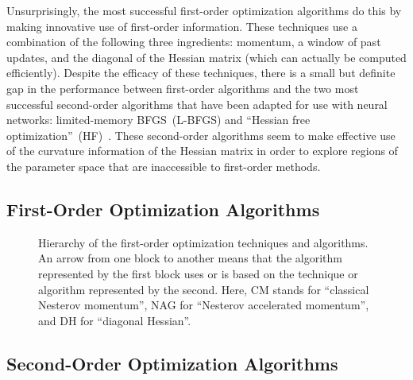 \documentclass[11pt,a4paper]{article}
\numberwithin{equation}{section}
\begin{document}
Unsurprisingly, the most successful first-order optimization algorithms do this
by making innovative use of first-order information. These techniques use a
combination of the following three ingredients: momentum, a window of past
updates, and the diagonal of the Hessian matrix (which can actually be computed
efficiently). Despite the efficacy of these techniques, there is a small but
definite gap in the performance between first-order algorithms and the two most
successful second-order algorithms that have been adapted for use with neural
networks: limited-memory BFGS~(L-BFGS) and ``Hessian free
optimization''~(HF)~\citep{martens2010deep, ngiam2011optimization,
sutskever2013importance}. These second-order algorithms seem to make effective
use of the curvature information of the Hessian matrix in order to explore
regions of the parameter space that are inaccessible to first-order methods.

\subsection{First-Order Optimization Algorithms}

\begin{figure}[t]
\centering
{}
\caption{Hierarchy of the first-order optimization techniques and algorithms.
An arrow from one block to another means that the algorithm represented by the
first block uses or is based on the technique or algorithm represented by the
second. Here, CM stands for ``classical Nesterov momentum'', NAG for ``Nesterov
accelerated momentum'', and DH for ``diagonal
Hessian''.\label{fig:first_order_hierarchy}}
\end{figure}




\subsection{Second-Order Optimization Algorithms}



\end{document}
